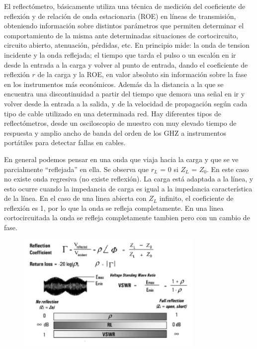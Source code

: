 \documentclass[a4paper,12pt,twoside]{article}
\begin{document}
El reflectómetro, básicamente utiliza una técnica de medición del coeficiente de reflexión y
de relación de onda estacionaria (ROE) en líneas de transmisión, obteniendo información
sobre distintos parámetros que permiten determinar el comportamiento de la misma ante
determinadas situaciones de cortocircuito, circuito abierto, atenuación, pérdidas, etc. En
principio mide: la onda de tension incidente y la onda reflejada; el tiempo que tarda el pulso
o un escalón en ir desde la entrada a la carga y volver al punto de entrada, dando el
coeficiente de reflexión $r$ de la carga y la ROE, en valor absoluto sin información sobre la
fase en los instrumentos más económicos. Además da la distancia a la que se encuentra
una discontinuidad a partir del tiempo que demora una señal en ir y volver desde la
entrada a la salida, y de la velocidad de propagación según cada tipo de cable utilizado en
una determinada red. Hay diferentes tipos de reflectómetros, desde un osciloscopio de
muestro con muy elevado tiempo de respuesta y amplio ancho de banda del orden de los
GHZ a instrumentos portátiles para detectar fallas en cables.

 En general podemos pensar en una onda que viaja hacia la carga y que se ve parcialmente “reflejada” en ella. 
Se observa que $r_L$ = $0$ si $Z_L$ = $Z_0$. En este caso no existe onda regresiva (no existe reflexión). La carga está adaptada a la línea, y esto ocurre cuando la impedancia de carga es igual a la impedancia característica de la línea. 
En el caso de una linea abierta con $Z_L$ infinito, el coeficiente de reflexión es 1, por lo que la onda se refleja completamente.
En una linea cortocircuitada la onda se refleja completamente tambien pero con un cambio de fase.

\begin{figure}[H]
    \centering
    \includegraphics[width=0.8\textwidth]{../img/reflectometria.png}
\end{figure}
\end{document}
